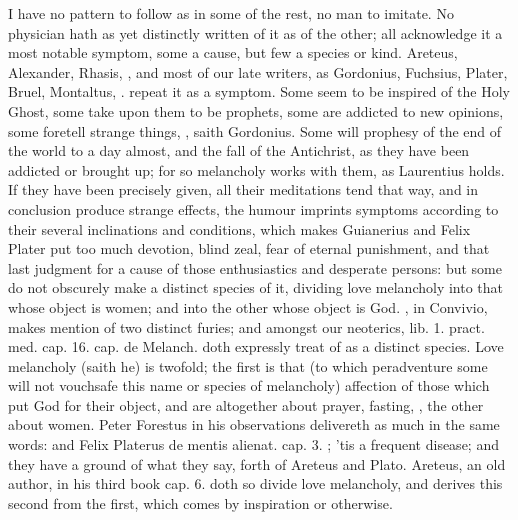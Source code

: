 {I have no pattern to follow as in some of the rest, no man to imitate.
No physician hath as yet distinctly written of it as of the other; all
acknowledge it a most notable symptom, some a cause, but few a species
or kind. Areteus, Alexander, Rhasis, \Avicenna{}, and most of our
late writers, as Gordonius, Fuchsius, Plater, Bruel, Montaltus, \etc{}.
repeat it as a symptom. Some seem to be inspired of the Holy
Ghost, some take upon them to be prophets, some are addicted to new
opinions, some foretell strange things, ,
saith Gordonius. Some will prophesy of the end of the world to a day
almost, and the fall of the Antichrist, as they have been addicted or
brought up; for so melancholy works with them, as Laurentius
holds. If they have been precisely given, all their meditations tend
that way, and in conclusion produce strange effects, the humour
imprints symptoms according to their several inclinations and
conditions, which makes Guianerius and Felix Plater put too
much devotion, blind zeal, fear of eternal punishment, and that last
judgment for a cause of those enthusiastics and desperate persons: but
some do not obscurely make a distinct species of it, dividing love
melancholy into that whose object is women; and into the other whose
object is God. \Plato, in \textlatin{Convivio}, makes mention of two distinct
furies; and amongst our neoterics, \textlatin{} \textlatin{lib. 1. pract.
med. cap. 16. cap. de Melanch.} doth expressly treat of as a distinct
species.  Love melancholy (saith he) is twofold; the first is
that (to which peradventure some will not vouchsafe this name or
species of melancholy) affection of those which put God for their
object, and are altogether about prayer, fasting, \etc{}, the other about
women. Peter Forestus in his observations delivereth as much in the
same words: and Felix Platerus \textlatin{de mentis alienat. cap. 3.}
; 'tis a frequent disease; and they have a ground of what they
say, forth of Areteus and Plato. Areteus, an old author, in his
third book \textlatin{cap. 6.} doth so divide love melancholy, and derives this
second from the first, which comes by inspiration or otherwise.

}
